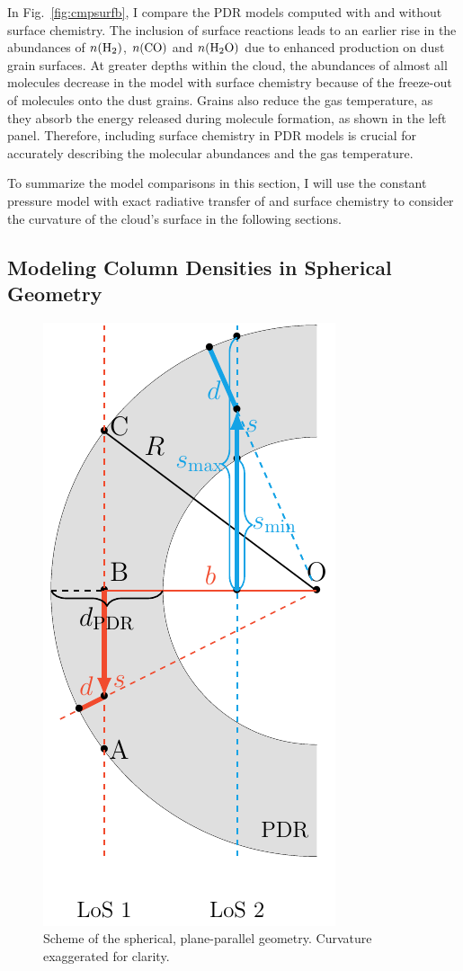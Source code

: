 \documentclass[12pt,a4paper]{article}
\newcommand{\mdpdr}{\texttt{MeudonPDR} code}
\begin{document}
In Fig.~\ref{fig:cmpsurfb}, I compare the PDR models computed with and without surface chemistry. The inclusion of surface reactions leads to an earlier rise in the abundances of $n(\ce{H2})$, $n(\ce{CO})$ and $n(\ce{H2O})$ due to enhanced production on dust grain surfaces. At greater depths within the cloud, the abundances of almost all molecules decrease in the model with surface chemistry because of the freeze-out of molecules onto the dust grains. Grains also reduce the gas temperature, as they absorb the energy released during molecule formation, as shown in the left panel. Therefore, including surface chemistry in PDR models is crucial for accurately describing the molecular abundances and the gas temperature.

To summarize the model comparisons in this section, I will use the constant pressure model with exact radiative transfer of  and surface chemistry to consider the curvature of the cloud's surface in the following sections.

\subsection{Modeling Column Densities in Spherical Geometry} \label{sec:sphere}
\begin{figure}
    \centering
    \includegraphics[width=.25\textwidth]{sphere_geometry_2LoS.pdf}
    \caption{Scheme of the spherical, plane-parallel geometry. Curvature exaggerated for clarity.} \label{fig:geometry}
\end{figure}

\end{document}
